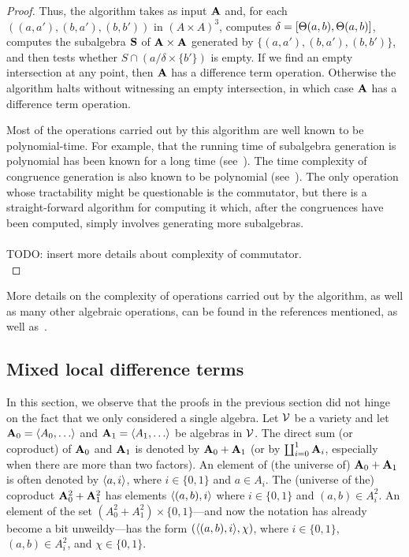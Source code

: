 \begin{proof}
    Thus, the algorithm takes as input $\mathbf{A}$ and, for each 
    $((a,a'), (b,a'), (b,b'))$ in $(A\times A)^3$, computes
    $\delta = [\Theta(a,b), \Theta(a,b)]$, computes the subalgebra
    $\mathbf{S}$ of $\mathbf{A}\times \mathbf{A}$ generated by
    $\{(a,a'), (b,a'), (b,b')\}$, and then
    tests whether $S \cap (a/\delta \times \{b'\})$ is empty.
    If we find an empty intersection at any point, then
    $\mathbf{A}$ has a difference term operation.
    Otherwise the algorithm halts without witnessing an empty
    intersection, in which case $\mathbf{A}$ has a difference term operation.

    Most of the operations carried out by this algorithm are well known to be
    polynomial-time.  For example, that the running time of subalgebra generation is
    polynomial has been known for a long time (see~\cite{MR0455543}).
    The time complexity of congruence generation is also known to be polynomial
    (see~\cite{MR2470585}).  The only operation whose tractability might be 
    questionable is the commutator, but there is a straight-forward algorithm for
    computing it which, after the congruences have been computed, simply
    involves generating more subalgebras.
    \\\\
    TODO: insert more details about complexity of commutator.\\
\end{proof}


More details on the complexity of operations carried out by the algorithm, as well as many other algebraic operations, can be found in the references mentioned, as well as~\cite{MR1871085,MR1695293,Freese:2009}. 





\subsection{Mixed local difference terms}
\label{sec:mixed-local-diff}
In this section, we observe that the proofs in the previous section
did not hinge on the fact that we only considered a single algebra.  
Let $\mathcal{V}$ be a variety and let $\bA_0=\< A_0, \dots\>$ and  $\bA_1=\< A_1, \dots\>$ be
algebras in $\mathcal{V}$.
The direct sum (or coproduct) of $\mathbf{A}_0$ and
$\mathbf{A}_1$ is denoted by $\mathbf{A}_0 + \mathbf{A}_1$
(or by $\coprod_{i=0}^1 \mathbf{A}_i$, especially when there are more than two
factors).
An element of (the universe of)
$\mathbf{A}_0 + \mathbf{A}_1$ is often denoted by $\langle a, i\rangle$,
where $i\in \{0,1\}$ and $a \in A_i$.
The (universe of the) coproduct %
$\mathbf{A}_0^2 + \mathbf{A}_1^2$ has elements
$\langle(a,b), i\rangle$ where $i\in \{0,1\}$ and $(a,b) \in A_i^2$.
An element of  the set $(A_0^2 + A_1^2) \times \{0,1\}$---and
now the notation has already become a bit unweildy---has
the form $(\langle(a,b), i\rangle, \chi)$, where $i\in \{0,1\}$, $(a,b) \in A_i^2$,
and $\chi\in \{0,1\}$. 

